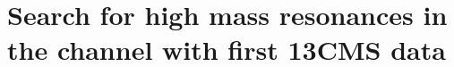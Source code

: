 \chapter{Search for high mass resonances in the \hww channel with first 13\TeV CMS data}\label{chap6}
\thispagestyle{empty}
